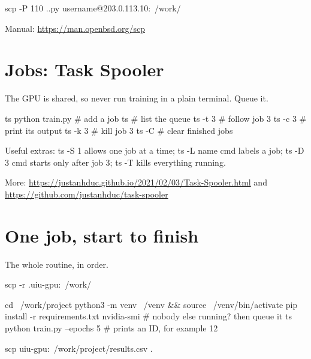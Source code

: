 \documentclass[12pt,a4paper]{article}
\newcommand{\cmd}[1]{{\ttfamily\small #1}}
\begin{document}
\begin{winblock}
scp -P 110 .\train.py username@203.0.113.10:~/work/
\end{winblock}

Manual: \url{https://man.openbsd.org/scp}

\section{Jobs: Task Spooler}

The GPU is shared, so never run training in a plain terminal. Queue it.

\begin{srvblock}
ts python train.py   # add a job
ts                   # list the queue
ts -t 3              # follow job 3
ts -c 3              # print its output
ts -k 3              # kill job 3
ts -C                # clear finished jobs
\end{srvblock}

Useful extras: \cmd{ts -S 1} allows one job at a time; \cmd{ts -L name cmd} labels a job;
\cmd{ts -D 3 cmd} starts only after job 3; \cmd{ts -T} kills everything running.

\begin{tipbox}
\raggedright More: \url{https://justanhduc.github.io/2021/02/03/Task-Spooler.html} and
\url{https://github.com/justanhduc/task-spooler}\par
\end{tipbox}

\section{One job, start to finish}

The whole routine, in order.

\begin{winblock}
scp -r .\project uiu-gpu:~/work/
\end{winblock}

\begin{srvblock}
cd ~/work/project
python3 -m venv ~/venv && source ~/venv/bin/activate
pip install -r requirements.txt
nvidia-smi                       # nobody else running? then queue it
ts python train.py --epochs 5    # prints an ID, for example 12
\end{srvblock}

\begin{winblock}
scp uiu-gpu:~/work/project/results.csv .
\end{winblock}
\end{document}
